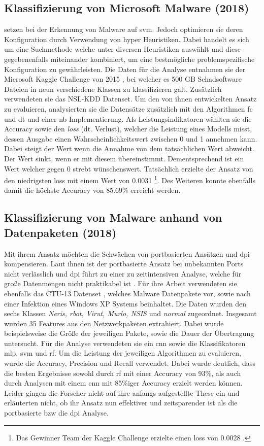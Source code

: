 \documentclass[
    12pt, %
    DIV10,
    ngerman, %
    a4paper, %
    oneside, %
    titlepage, %
    parskip=half, %
    headings=normal, %
    listof=totoc, %
    bibliography=totoc, %
    index=totoc, %
    captions=tableheading, %
    final %
]{scrreprt}
\begin{document}
\subsection{Klassifizierung von Microsoft Malware (2018)}\label{sabar}
\textcite{Sabar2018} setzen bei der Erkennung von Malware auf \ac{svm}. Jedoch optimieren sie deren Konfiguration durch Verwendung von hyper Heuristiken. Dabei handelt es sich um eine Suchmethode welche unter diversen Heuristiken auswählt und diese gegebenenfalls miteinander kombiniert, um eine bestmögliche problemspezifische Konfiguration zu gewährleisten. Die Daten für die Analyse entnahmen sie der Microsoft Kaggle Challenge von 2015 \parencite{Kaggle}, bei welcher es 500 GB Schadsoftware Dateien in neun verschiedene Klassen zu klassifizieren galt. Zusätzlich verwendeten sie das NSL-KDD Datenset. Um den von ihnen entwickelten Ansatz zu evaluieren, analysierten sie die Datensätze zusätzlich mit den Algorithmen \ac{fc} und \ac{dt} und einer \ac{nb} Implementierung. Als Leistungsindikatoren wählten sie die Accuracy sowie den \emph{loss} (dt. Verlust), welcher die Leistung eines Modells misst, dessen Ausgabe einen Wahrscheinlichkeitswert zwischen 0 und 1 annehmen kann. Dabei steigt der Wert wenn die Annahme von dem tatsächlichen Wert abweicht. Der Wert sinkt, wenn er mit diesem übereinstimmt. Dementsprechend ist ein Wert welcher gegen 0 strebt wünschenswert. Tatsächlich erzielte der Ansatz von \textcite{Sabar2018} den niedrigsten loss mit einem Wert von 0.0031 \footnote{Das Gewinner Team der Kaggle Challenge erzielte einen loss von 0.0028 \parencite{leader}.}. Des Weiteren konnte ebenfalls damit die höchste Accuracy von 85.69\% erreicht werden.
%
\subsection{Klassifizierung von Malware anhand von Datenpaketen (2018)}
Mit ihrem Ansatz möchten \textcite{Yeo2018} die Schwächen von portbasierten Ansätzen und \ac{dpi} kompensieren. Laut ihnen ist der portbasierte Ansatz bei unbekannten Ports nicht verlässlich und \ac{dpi} führt zu einer zu zeitintensiven Analyse, welche für gro{\ss}e Datenmengen nicht praktikabel ist \parencite{dharmapurikar2003deep}. Für ihre Arbeit verwendeten sie ebenfalls das CTU-13 Datenset \parencite{garcia2014empirical}, welches Malware Datenpakete vor, sowie nach einer Infektion eines Windows XP Systems beinhaltet. Die Daten wurden den sechs Klassen \emph{Neris, rbot, Virut, Murlo, NSIS} und \emph{normal} zugeordnet. Insgesamt wurden 35 Features aus den Netzwerkpaketen extrahiert. Dabei wurde beispielsweise die Grö{\ss}e der jeweiligen Pakete, sowie die Dauer der Übertragung untersucht. Für die Analyse verwendeten sie ein \ac{cnn} sowie die Klassifikatoren \ac{mlp}, \ac{svm} und \ac{rf}. Um die Leistung der jeweiligen Algorithmen zu evaluieren, wurde die Accuracy, Precision und Recall verwendet. Dabei wurde deutlich, dass die besten Ergebnisse sowohl durch \ac{rf} mit einer Accuracy von 93\%, als auch durch Analysen mit einem \ac{cnn} mit 85\%iger Accuracy erzielt werden können. \\
Leider gingen die Forscher nicht auf ihre anfangs aufgestellte These ein und erläuterten nicht, ob ihr Ansatz nun effektiver und zeitsparender ist als die portbasierte bzw die \ac{dpi} Analyse.
%
\end{document}
